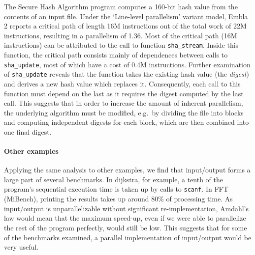 The Secure Hash Algorithm program computes a 160-bit hash value from the contents of an input file.
Under the `Line-level parallelism' variant model, Embla 2 reports a critical path of length 16M instructions out of the total work of 22M instructions, resulting in a parallelism of 1.36.
Most of the critical path (16M instructions) can be attributed to the call to function \texttt{sha\_stream}.
Inside this function, the critical path consists mainly of dependences between calls to \texttt{sha\_update}, most of which have a cost of 0.4M instructions.
Further examination of \texttt{sha\_update} reveals that the function takes the existing hash value (the \emph{digest}) and derives a new hash value which replaces it.
Consequently, each call to this function must depend on the last as it requires the digest computed by the last call.
This suggests that in order to increase the amount of inherent parallelism, the underlying algorithm must be modified, e.g.\ by dividing the file into blocks and computing independent digests for each block, which are then combined into one final digest.

\paragraph{Other examples}

Applying the same analysis to other examples, we find that input/output forms a large part of several benchmarks.
In \textsf{dijkstra}, for example, a tenth of the program's sequential execution time is taken up by calls to \texttt{scanf}.
In \textsf{FFT} (MiBench), printing the results takes up around 80\% of processing time.
As input/output is unparallelizable without significant re-implementation, Amdahl's law would mean that the maximum speed-up, even if we were able to parallelize the rest of the program perfectly, would still be low.
This suggests that for some of the benchmarks examined, a parallel implementation of input/output would be very useful.










































